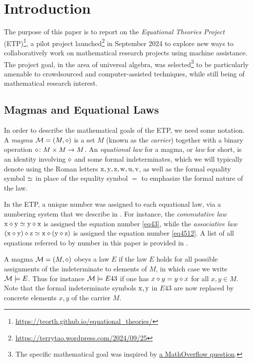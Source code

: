 \section{Introduction}

The purpose of this paper is to report on the \emph{Equational Theories Project} (ETP)\footnote{\url{https://teorth.github.io/equational_theories/}}, a pilot project launched\footnote{\url{https://terrytao.wordpress.com/2024/09/25}} in September 2024 to explore new ways to collaboratively work on mathematical research projects using machine assistance. The project goal, in the area of universal algebra, was selected\footnote{The specific mathematical goal was inspired by \href{https://mathoverflow.net/questions/450930}{a MathOverflow question}.} to be particularly amenable to crowdsourced and computer-assisted techniques, while still being of mathematical research interest. 

\subsection{Magmas and Equational Laws}

In order to describe the mathematical goals of the ETP, we need some notation. A \emph{magma} ${\mathcal{M}} = (M,\diamond)$ is a set $M$ (known as the \emph{carrier}) together with a binary operation $\diamond \colon M \times M \to M$. An \emph{equational law} for a magma, or \emph{law} for short, is an identity involving $\diamond$ and some formal indeterminates, which we will typically denote using the Roman letters $\mathrm{x},\mathrm{y},\mathrm{z},\mathrm{w},\mathrm{u},\mathrm{v}$, as well as the formal equality symbol $\simeq$ in place of the equality symbol $=$ to emphasize the formal nature of the law.

In the ETP, a unique number was assigned to each equational law, via a numbering system that we describe in .  For instance, the \emph{commutative law} $\mathrm{x} \diamond \mathrm{y} \simeq \mathrm{y} \diamond \mathrm{x}$ is assigned the equation number \eqref{eq43}, while the \emph{associative law} $(\mathrm{x} \diamond \mathrm{y}) \diamond \mathrm{z} \simeq \mathrm{x} \diamond (\mathrm{y} \diamond \mathrm{z})$ is assigned the equation number \eqref{eq4512}.  A list of all equations referred to by number in this paper is provided in .

A magma ${\mathcal{M}} = (M,\diamond)$ obeys a law $E$ if the law $E$ holds for all possible assignments of the indeterminate to elements of $M$, in which case we write ${\mathcal{M}} \models E$. Thus for instance ${\mathcal{M}} \models E43$ if one has $x \diamond y = y \diamond x$ for all $x,y \in M$.  Note that the formal indeterminate symbols $\mathrm{x}, \mathrm{y}$ in $E43$ are now replaced by concrete elements $x,y$ of the carrier $M$.

